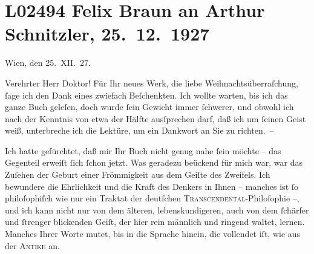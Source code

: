 

\section[Felix Braun an Arthur Schnitzler, 25. 12. 1927]{L02494 Felix Braun an Arthur Schnitzler, 25. 12. 1927}
\nopagebreak{}
\rehead{ }\normalsize\beginnumbering{}
\toendnotes[C]{\smallbreak\pagebreak[2]}
\toendnotes[C]{\smallbreak}
\pstart
           \centering{}{\pb}Wien, den 25. XII. 27.\pend
           
\pstart{}Verehrter Herr Doktor!\pend\vspace{0.5em}
\pstart
           Für Ihr neues Werk, die liebe
               Weihnachtsüberraſchung, ſage ich den Dank eines zwiefach Beſchenkten. Ich wollte
               warten, bis ich das ganze Buch geleſen, doch wurde ſein Gewicht immer ſchwerer, und
               obwohl ich nach der Kenntnis von etwa der Hälfte ausſprechen darf, daß ich um ſeinen
               Geist weiß, unterbreche ich die Lektüre, um ein Dankwort an Sie zu richten. – \pend
           
\pstart
           Ich hatte gefürchtet, daß mir Ihr Buch nicht genug \introOben{}nahe\introOben{} ſein
               möchte – das Gegenteil erweiſt ſich ſchon jetzt. Was geradezu beückend für {\pb}mich war, war das
               Zuſehen der Geburt einer Frömmigkeit aus dem Geiſte des Zweifels. Ich bewundere die
               Ehrlichkeit und die Kraft des Denkers in Ihnen – manches ist ſo philoſophiſch wie nur
               ein Traktat der deutſchen \textsc{Transcendental}-Philoſophie –, und
               ich kann nicht \introOben{}nur\introOben{} von dem älteren, lebenskundigeren, auch
               von dem ſchärfer und ſtrenger blickenden Geiſt, der hier rein männlich und ringend
               waltet, lernen. Manches Ihrer Worte mutet, bis in die Sprache hinein, die vollendet
               iſt, wie aus der \textsc{Antike} an.\pend
           
